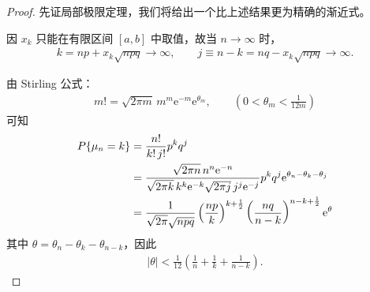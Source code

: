 \documentclass[../../main.tex]{subfiles}
\begin{document}
\begin{proof}
先证局部极限定理，我们将给出一个比上述结果更为精确的渐近式。

因 $x_k$ 只能在有限区间 $[a,b]$ 中取值，故当 $n\to\infty$ 时，
\begin{align}
k=np+x_k\sqrt{npq}\to\infty,\qquad j\equiv n-k=nq-x_k\sqrt{npq}\to\infty.
\end{align}

由 Stirling 公式：
\begin{align}
m!=\sqrt{2\pi m}\,m^{m}\mathrm{e}^{-m}\mathrm{e}^{\theta_m},\qquad\left(0<\theta_m<\frac{1}{12m}\right)
\end{align}
可知
\begin{align}
P\{\mu_n=k\}&=\frac{n!}{k!\,j!}p^{k}q^{j}\notag\\
&=\frac{\sqrt{2\pi n}\,n^{n}\mathrm{e}^{-n}}{\sqrt{2\pi k}\,k^{k}\mathrm{e}^{-k}\sqrt{2\pi j}\,j^{j}\mathrm{e}^{-j}}p^{k}q^{j}\mathrm{e}^{\theta_n-\theta_k-\theta_j}\notag\\
&=\frac{1}{\sqrt{2\pi}\sqrt{npq}}\left(\frac{np}{k}\right)^{k+\frac12}\left(\frac{nq}{n-k}\right)^{n-k+\frac12}\mathrm{e}^{\theta}
\end{align}
其中 $\theta=\theta_n-\theta_k-\theta_{n-k}$，因此
\begin{align}
|\theta|<\frac{1}{12}\left(\frac1n+\frac1k+\frac{1}{n-k}\right).
\end{align}


\end{proof}
\end{document}
